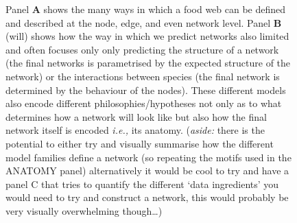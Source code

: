 \documentclass[
]{article}
\begin{document}
\begin{figure}


\caption{\label{fig-concept}Panel \textbf{A} shows the many ways in
which a food web can be defined and described at the node, edge, and
even network level. Panel \textbf{B} (will) shows how the way in which
we predict networks also limited and often focuses only only predicting
the structure of a network (the final networks is parametrised by the
expected structure of the network) or the interactions between species
(the final network is determined by the behaviour of the nodes). These
different models also encode different philosophies/hypotheses not only
as to what determines how a network will look like but also how the
final network itself is encoded \emph{i.e.,} its anatomy. (\emph{aside:}
there is the potential to either try and visually summarise how the
different model families define a network (so repeating the motifs used
in the ANATOMY panel) alternatively it would be cool to try and have a
panel C that tries to quantify the different `data ingredients' you
would need to try and construct a network, this would probably be very
visually overwhelming though\ldots)}

\end{figure}%
\end{document}
